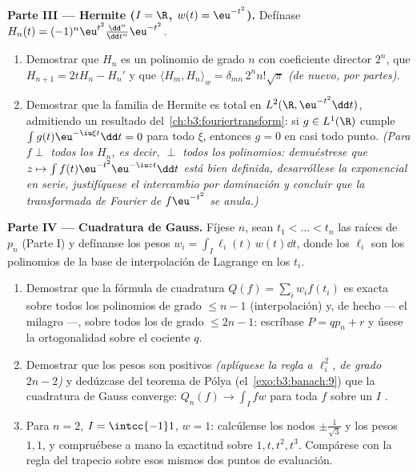 \begin{problem}
\medskip
\noindent\textbf{Parte III --- Hermite ($I = \R$, $w(t) =
\eu^{-t^2}$).} Defínase $H_n(t) =
(-1)^n\eu^{t^2}\frac{\dd^n}{\dd t^n}\eu^{-t^2}$.
\begin{enumerate}[resume]
  \item Demostrar que $H_n$ es un polinomio de grado $n$ con coeficiente
  director $2^n$, que $H_{n+1} = 2tH_n -
        H_n'$ y que $\langle H_m, H_n\rangle_w =
        \delta_{mn}\,2^nn!\sqrt\pi$ \emph{(de nuevo, por partes)}. \item
  Demostrar que la familia de Hermite es total en $L^2(\R,
        \eu^{-t^2}\dd t)$, admitiendo un resultado
  del~\cref{ch:b3:fouriertransform}: si $g \in L^1(\R)$ cumple
  $\int g(t)\eu^{-\iu\xi t}\dd t = 0$ para todo $\xi$, entonces $g = 0$
  en casi todo punto. \emph{(Para $f \perp$ todos los $H_n$, es decir,
  $\perp$ todos los polinomios: demuéstrese que $z \mapsto \int
        f(t)\eu^{-t^2}\eu^{-\iu zt}\dd t$ está bien definida,
  desarróllese la exponencial en serie, justifíquese el intercambio por
  dominación y concluir que la transformada de Fourier de $f\eu^{-t^2}$
  se anula.)}
\end{enumerate}

\medskip
\noindent\textbf{Parte IV --- Cuadratura de Gauss.} Fíjese $n$, sean
$t_1 < \dots < t_n$ las raíces de $p_n$ (Parte I) y defínanse los pesos
$w_i = \int_I \ell_i(t)\,w(t)\dd t$, donde los $\ell_i$ son los
polinomios de la base de interpolación de Lagrange en los $t_i$.
\begin{enumerate}[resume]
  \item Demostrar que la fórmula de cuadratura $Q(f) = \sum_iw_if(t_i)$
  es exacta sobre todos los polinomios de grado $\leq n - 1$
  (interpolación) y, de hecho --- el milagro ---, sobre todos los de
  grado $\leq 2n - 1$: escríbase $P =
        qp_n + r$ y úsese la ortogonalidad sobre el cociente $q$. \item
  Demostrar que los pesos son positivos \emph{(aplíquese la regla a
  $\ell_i^2$, de grado $2n -
        2$)} y dedúzcase del teorema de Pólya
  (el~\cref{exo:b3:banach:9}) que la cuadratura de Gauss converge:
  $Q_n(f) \to \int_I fw$ para toda $f$
   sobre un $I$
  . \item Para $n = 2$,
  $I = \intcc{-1}1$, $w = 1$: calcúlense los nodos $\pm\frac1{\sqrt3}$ y
  los pesos $1, 1$, y compruébese a mano la exactitud sobre
  $1, t, t^2, t^3$. Compárese con la regla del trapecio sobre esos
  mismos dos puntos de evaluación.
\end{enumerate}


\end{problem}

